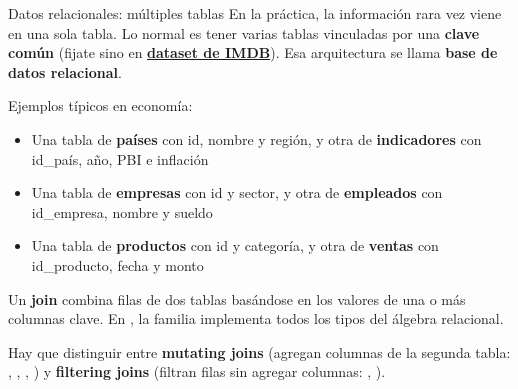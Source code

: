 \documentclass[8pt]{beamer}
\begin{document}
	\begin{frame}[fragile]{Datos relacionales: múltiples tablas}
		En la práctica, la información rara vez viene en una sola tabla. Lo normal es tener varias tablas vinculadas por una \textbf{clave común} (fijate sino en \href{https://developer.imdb.com/non-commercial-datasets/}{\textbf{dataset de IMDB}}). Esa arquitectura se llama \textbf{base de datos relacional}.

		Ejemplos típicos en economía:
		\begin{itemize}
			\item Una tabla de \textbf{países} con id, nombre y región, y otra de \textbf{indicadores} con id\_país, año, PBI e inflación
			\item Una tabla de \textbf{empresas} con id y sector, y otra de \textbf{empleados} con id\_empresa, nombre y sueldo
			\item Una tabla de \textbf{productos} con id y categoría, y otra de \textbf{ventas} con id\_producto, fecha y monto
		\end{itemize}

		Un \textbf{join} combina filas de dos tablas basándose en los valores de una o más columnas clave. En , la familia  implementa todos los tipos del álgebra relacional.

		\begin{alertblock}{}
			Hay que distinguir entre \textbf{mutating joins} (agregan columnas de la segunda tabla: , , , ) y \textbf{filtering joins} (filtran filas sin agregar columnas: , ).
		\end{alertblock}
	\end{frame}
\end{document}
